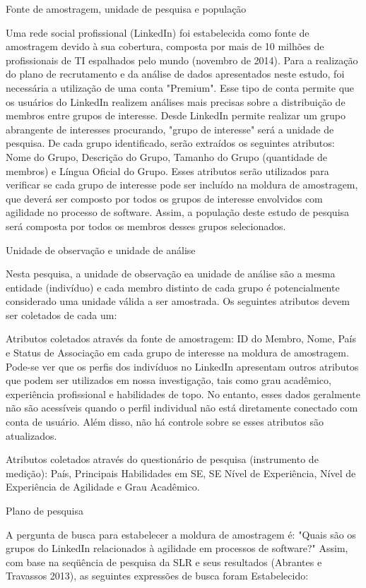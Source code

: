 Fonte de amostragem, unidade de pesquisa e população

Uma rede social profissional (LinkedIn) foi estabelecida como fonte de
amostragem devido à sua cobertura, composta por mais de 10 milhões de
profissionais de TI espalhados pelo mundo (novembro de 2014). Para a realização
do plano de recrutamento e da análise de dados apresentados neste estudo, foi
necessária a utilização de uma conta "Premium". Esse tipo de conta permite que
os usuários do LinkedIn realizem análises mais precisas sobre a distribuição de
membros entre grupos de interesse. Desde LinkedIn permite realizar um grupo
abrangente de interesses procurando, "grupo de interesse" será a unidade de
pesquisa. De cada grupo identificado, serão extraídos os seguintes atributos:
Nome do Grupo, Descrição do Grupo, Tamanho do Grupo (quantidade de membros) e
Língua Oficial do Grupo. Esses atributos serão utilizados para verificar se cada
grupo de interesse pode ser incluído na moldura de amostragem, que deverá ser
composto por todos os grupos de interesse envolvidos com agilidade no processo
de software. Assim, a população deste estudo de pesquisa será composta por todos
os membros desses grupos selecionados.

Unidade de observação e unidade de análise

Nesta pesquisa, a unidade de observação ea unidade de análise são a mesma
entidade (indivíduo) e cada membro distinto de cada grupo é potencialmente
considerado uma unidade válida a ser amostrada. Os seguintes atributos devem ser
coletados de cada um:

Atributos coletados através da fonte de amostragem: ID do Membro, Nome, País e
Status de Associação em cada grupo de interesse na moldura de amostragem.
Pode-se ver que os perfis dos indivíduos no LinkedIn apresentam outros atributos
que podem ser utilizados em nossa investigação, tais como grau acadêmico,
experiência profissional e habilidades de topo. No entanto, esses dados
geralmente não são acessíveis quando o perfil individual não está diretamente
conectado com conta de usuário. Além disso, não há controle sobre se esses
atributos são atualizados.

Atributos coletados através do questionário de pesquisa (instrumento de
medição): País, Principais Habilidades em SE, SE Nível de Experiência, Nível de
Experiência de Agilidade e Grau Acadêmico.

Plano de pesquisa


A pergunta de busca para estabelecer a moldura de amostragem é: "Quais são os
grupos do LinkedIn relacionados à agilidade em processos de software?" Assim,
com base na seqüência de pesquisa da SLR e seus resultados (Abrantes e Travassos
2013), as seguintes expressões de busca foram Estabelecido:


